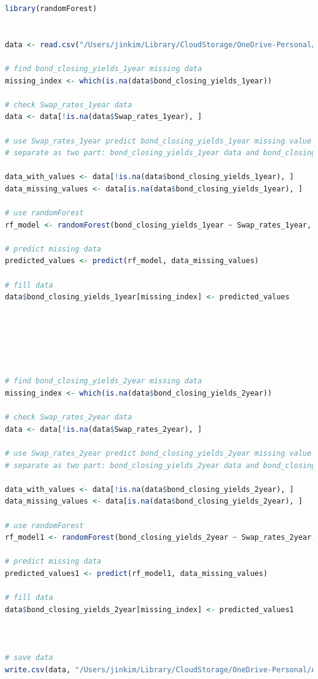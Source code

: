 \documentclass[10pt]{article}
\begin{document}
\begin{lstlisting}[language=R]
library(randomForest)


data <- read.csv("/Users/jinkim/Library/CloudStorage/OneDrive-Personal/Aucklanduni/2023 S2/ECON 723/Group Project/data_nz.csv")

# find bond_closing_yields_1year missing data
missing_index <- which(is.na(data$bond_closing_yields_1year))

# check Swap_rates_1year data
data <- data[!is.na(data$Swap_rates_1year), ]

# use Swap_rates_1year predict bond_closing_yields_1year missing value
# separate as two part: bond_closing_yields_1year data and bond_closing_yields_1year missing data

data_with_values <- data[!is.na(data$bond_closing_yields_1year), ]
data_missing_values <- data[is.na(data$bond_closing_yields_1year), ]

# use randomForest
rf_model <- randomForest(bond_closing_yields_1year ~ Swap_rates_1year, data=data_with_values, ntree=10000)

# predict missing data
predicted_values <- predict(rf_model, data_missing_values)

# fill data
data$bond_closing_yields_1year[missing_index] <- predicted_values






# find bond_closing_yields_2year missing data
missing_index <- which(is.na(data$bond_closing_yields_2year))

# check Swap_rates_2year data
data <- data[!is.na(data$Swap_rates_2year), ]

# use Swap_rates_2year predict bond_closing_yields_2year missing value
# separate as two part: bond_closing_yields_2year data and bond_closing_yields_2year missing data

data_with_values <- data[!is.na(data$bond_closing_yields_2year), ]
data_missing_values <- data[is.na(data$bond_closing_yields_2year), ]

# use randomForest
rf_model1 <- randomForest(bond_closing_yields_2year ~ Swap_rates_2year, data=data_with_values, ntree=10000)

# predict missing data
predicted_values1 <- predict(rf_model1, data_missing_values)

# fill data
data$bond_closing_yields_2year[missing_index] <- predicted_values1



# save data
write.csv(data, "/Users/jinkim/Library/CloudStorage/OneDrive-Personal/Aucklanduni/2023 S2/ECON 723/Group Project/nz.csv", row.names=FALSE)


\end{lstlisting}
\end{document}
